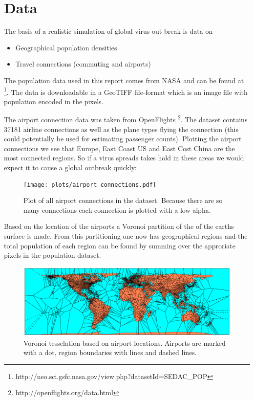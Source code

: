 \section{Data}

The basis of a realistic simulation of global virus out break is data on
\begin{itemize}
	\item Geographical population densities
	\item Travel connections (commuting and airports)
\end{itemize}

The population data used in this report comes from NASA and can be found at \footnote{http://neo.sci.gsfc.nasa.gov/view.php?datasetId=SEDAC\_POP}. The data is downloadable in a GeoTIFF file-format which is an image file with population encoded in the pixels. 


The airport connection data was taken from OpenFlights \footnote{http://openflights.org/data.html}. The dataset contains 37181 airline connections as well as the plane types flying the connection (this could potentially be used for estimating passenger counts). Plotting the airport connections we see that Europe, East Coast US and East Cost China are the most connected regions. So if a virus spreads takes hold in these areas we would expect it to cause a global outbreak quickly:

\begin{figure}[H]
	\centering
	\texttt{[image: plots/airport\_connections.pdf]}
	\caption{Plot of all airport connections in the dataset. Because there are so many connections each connection is plotted with a low alpha.}
\end{figure}

Based on the location of the airports a Voronoi partition of the of the earths surface is made. From this partitioning one now has geographical regions and the total population of each region can be found by summing over the approriate pixels in the population dataset. 

\begin{figure}[H]
	\centering
	\includegraphics[width=1.0 \textwidth]{plots/voronoi.pdf}
	\caption{Voronoi tesselation based on airport locations. Airports are marked with a dot, region boundaries with lines and dashed lines.}
\end{figure}

